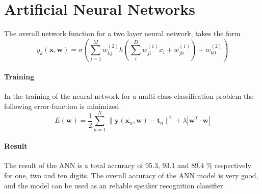 \section*{Artificial Neural Networks}

The overall network function for a two layer neural network, takes the form
\begin{equation}
y_k(\mathbf{x},\mathbf{w}) = \sigma \left( \sum_{j=1}^{M} w_{kj}^{(2)} h\left( \sum_{i}^{D} w_{ji}^{(1)} x_i + w_{j0}^{(1)} \right) + w_{k0}^{(2)} \right) 
\label{eq:ANN_overall_rap}
\end{equation}

\paragraph*{Training}
In the training of the neural network for a multi-class classification problem the following error-function is minimized.
\begin{equation}
E(\mathbf{w}) = \dfrac{1}{2} \sum_{n=1}^{N}\| \mathbf{y}(\mathbf{x}_n,\mathbf{w})-\mathbf{t}_n \|^2+\lambda| \mathbf{w}^T \cdot \mathbf{w}|
\label{eq:ANN_error_rap}
\end{equation}



\paragraph*{Result}
The result of the ANN is a total accuracy of 95.3, 93.1 and 89.4 \% respectively for one, two and ten digits. 
The overall accuracy of the ANN model is very good, and the model can be used as an reliable speaker recognition classifier.  
